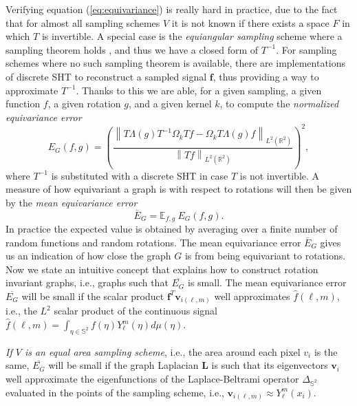 \documentclass{article} %
\newcommand{\norm}[1]{\left\lVert#1\right\rVert}
\begin{document}
Verifying equation (\ref{eq:equivariance}) is really hard in practice, due to the fact that for almost all sampling schemes $V$ it is not known if there exists a space $F$ in which $T$ is invertible. A special case is the \textit{equiangular sampling} scheme where a sampling theorem holds \cite{Driscoll:1994:CFT:184069.184073}, and thus we have a closed form of $T^{-1}$. For sampling schemes where no such sampling theorem is available, there are implementations of discrete SHT to reconstruct a sampled signal $\mathbf f$, thus providing a way to approximate $T^{-1}$. Thanks to this we are able, for a given sampling, a given function $f$, a given rotation $g$, and a given kernel $k$, to compute the \textit{normalized equivariance error}
\begin{equation} \label{eq:equivariance error}
	E_{G}(f, g) = \left(\frac{ \norm {T \Lambda(g) T^{-1} \Omega_k Tf - \Omega_k T \Lambda(g) f}_{L^2(\mathbb R^2)}}{\norm {Tf}_{L^2(\mathbb R^2)}}\right)^2,
\end{equation}
where $T^{-1}$ is substituted with a discrete SHT in case $T$ is not invertible.
A measure of how equivariant a graph is with respect to rotations will then be given by the \textit{mean equivariance error}
\begin{equation} \label{eq:mean equivariance error}
	\overline E_G = \mathbb E_{f, g} \ E_G(f, g).
\end{equation}
In practice the expected value is obtained by averaging over a finite number of random functions and random rotations. The mean equivariance error $\overline E_G$ gives us an indication of how close the graph $G$ is from being equivariant to rotations. Now we state an intuitive concept that explains how to construct rotation invariant graphs, i.e., graphs such that $\overline{E_G}$ is small.
The mean equivariance error $\overline{E_G}$ will be small if the scalar product $\mathbf f^T \mathbf v_{i(\ell, m)}$ well approximates $\hat {f}(\ell,m)$, i.e., the $L^2$ scalar product of the continuous signal $\hat {f}(\ell,m)= \int_{\eta \in \mathbb S^2}f(\eta)Y_\ell^m(\eta)d\mu(\eta)$.

\textit{If $V$ is an equal area sampling scheme}, i.e., the area around each pixel $v_i$ is the same, $\overline{E_G}$ will be small if the graph Laplacian $\mathbf L$ is such that its eigenvectors $\mathbf v_i$ well approximate the eigenfunctions of the Laplace-Beltrami operator $\Delta_{\mathbb S^2}$ evaluated in the points of the sampling scheme, i.e., $\mathbf v_{i(\ell, m)} \approx Y_\ell^m(x_i)$.
\end{document}
